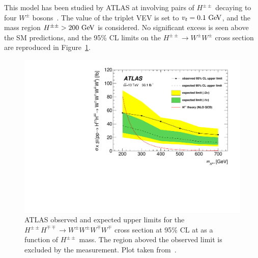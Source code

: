 This model has been studied by ATLAS at  involving pairs of $H^{\pm\pm}$ decaying to four $W^\pm$ bosons~\cite{2019.atlas-double-charged-higgs}.
The value of the triplet VEV is set to $v_t = 0.1\gev$, and the mass region $H^{\pm\pm} > 200\gev$ is considered.
No significant excess is seen above the SM predictions, and the 95\% CL limits on the $H^{\pm\pm}\rightarrow W^{\pm}W^{\pm}$ cross section are reproduced in Figure~\ref{fig:atlas-hpp-limits}.

\begin{figure}[htbp]
  \centering
  \includegraphics[width=.6\textwidth]{figs/ssww_13tev/extensions/atlas-hpp}
  \caption[ATLAS observed and expected upper limits for the $H^{\pm\pm}H^{\mp\mp}\rightarrow W^{\pm}W^{\pm}W^{\mp}W^{\mp}$ cross section at 95\% CL at  as a function of $H^{\pm\pm}$ mass.  The region aboved the observed limit is excluded by the measurement.]{ATLAS observed and expected upper limits for the $H^{\pm\pm}H^{\mp\mp}\rightarrow W^{\pm}W^{\pm}W^{\mp}W^{\mp}$ cross section at 95\% CL at  as a function of $H^{\pm\pm}$ mass.  The region aboved the observed limit is excluded by the measurement. Plot taken from~\cite{2019.atlas-double-charged-higgs}.}
  \label{fig:atlas-hpp-limits}
\end{figure}


